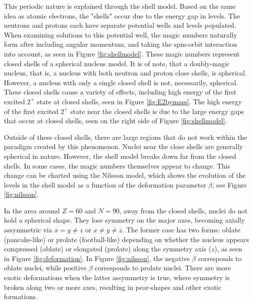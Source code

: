 This periodic nature is explained through the shell model. Based on the same idea as atomic electrons, the "shells" occur due to the energy gap in levels. The neutrons and protons each have separate potential wells and levels populated. When examining solutions to this potential well, the magic numbers naturally form after including angular momentum, and taking the spin-orbit interaction into account, as seen in Figure \ref{fig:shellmodel}. These magic numbers represent closed shells of a spherical nucleus model. It is of note, that a doubly-magic nucleus, that is, a nucleus with both neutron and proton close shells, is spherical. However, a nucleus with only a single closed shell is not, necessarily, spherical. These closed shells cause a variety of effects, including high energy of the first excited $2^+$ state at closed shells, seen in Figure \ref{fig:E2bymass}. The high energy of the first excited $2^+$ state near the closed shells is due to the large energy gaps that occur at closed shells, seen on the right side of Figure \ref{fig:shellmodel}.





% 

Outside of these closed shells, there are large regions that do not work within the paradigm created by this phenomenon. Nuclei near the close shells are generally spherical in nature. However, the shell model breaks down far from the closed shells. In some cases, the magic numbers themselves appear to change. This change can be charted using the Nilsson model, which shows the evolution of the levels in the shell model as a function of the deformation parameter $\beta$, see Figure \ref{fig:nilsson}.



In the area around $Z=60$ and $N=90$, away from the closed shells, nuclei do not hold a spherical shape. They lose symmetry on the major axes, becoming axially assymmetric via $x=y\neq z$ or $x \neq y \neq z$. The former case has two forms: oblate (pancake-like) or prolate (football-like) depending on whether the nucleus appears compressed (oblate) or elongated (prolate) along the symmetry axis ($z$), as seen in Figure \ref{fig:deformation}. In Figure \ref{fig:nilsson}, the negative $\beta$ corresponds to oblate nuclei, while positive $\beta$ corresponds to prolate nuclei. There are more exotic deformations when the latter assymmetry is true, where symmetry is broken along two or more axes, resulting in pear-shapes and other exotic formations.

